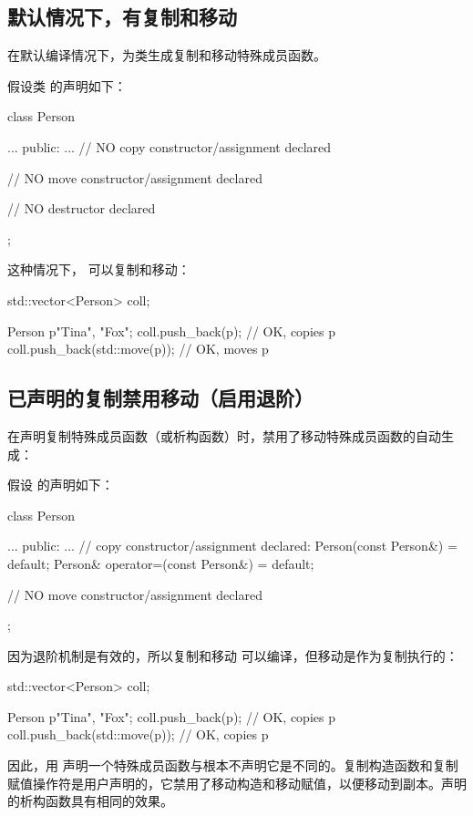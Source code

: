 \subsection{默认情况下，有复制和移动}

在默认编译情况下，为类生成复制和移动特殊成员函数。

假设类  的声明如下：

\begin{cppcode}
class Person {
	...
public:
	...
	// NO copy constructor/assignment declared

	// NO move constructor/assignment declared

	// NO destructor declared
};
\end{cppcode}

这种情况下， 可以复制和移动：

\begin{cppcode}
std::vector<Person> coll;

Person p{"Tina", "Fox"};
coll.push_back(p); // OK, copies p
coll.push_back(std::move(p)); // OK, moves p
\end{cppcode}

\subsection{已声明的复制禁用移动（启用退阶）}

在声明复制特殊成员函数（或析构函数）时，禁用了移动特殊成员函数的自动生成：

假设  的声明如下：

\begin{cppcode}
class Person {
	...
public:
	...
	// copy constructor/assignment declared:
	Person(const Person&) = default;
	Person& operator=(const Person&) = default;

	// NO move constructor/assignment declared
};
\end{cppcode}

因为退阶机制是有效的，所以复制和移动  可以编译，但移动是作为复制执行的：

\begin{cppcode}
std::vector<Person> coll;

Person p{"Tina", "Fox"};
coll.push_back(p); // OK, copies p
coll.push_back(std::move(p)); // OK, copies p
\end{cppcode}

因此，用  声明一个特殊成员函数与根本不声明它是不同的。复制构造函数和复制赋值操作符是用户声明的，它禁用了移动构造和移动赋值，以便移动到副本。声明的析构函数具有相同的效果。

